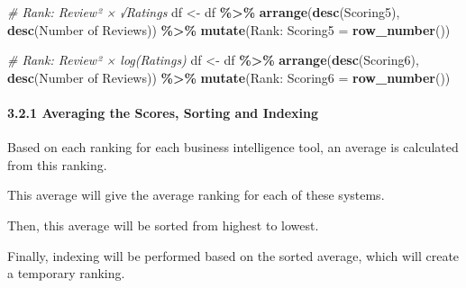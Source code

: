 \documentclass[
]{article}
\newenvironment{Shaded}{\begin{snugshade}}{\end{snugshade}}
\newcommand{\AttributeTok}[1]{\textcolor[rgb]{0.13,0.29,0.53}{#1}}
\newcommand{\CommentTok}[1]{\textcolor[rgb]{0.56,0.35,0.01}{\textit{#1}}}
\newcommand{\FunctionTok}[1]{\textcolor[rgb]{0.13,0.29,0.53}{\textbf{#1}}}
\newcommand{\NormalTok}[1]{#1}
\newcommand{\OtherTok}[1]{\textcolor[rgb]{0.56,0.35,0.01}{#1}}
\newcommand{\SpecialCharTok}[1]{\textcolor[rgb]{0.81,0.36,0.00}{\textbf{#1}}}
\newcommand{\StringTok}[1]{\textcolor[rgb]{0.31,0.60,0.02}{#1}}
\begin{document}
\begin{Shaded}
\begin{Highlighting}[]
\CommentTok{\# Rank: Review² × √Ratings}
\NormalTok{df }\OtherTok{\textless{}{-}}\NormalTok{ df }\SpecialCharTok{\%\textgreater{}\%}
  \FunctionTok{arrange}\NormalTok{(}\FunctionTok{desc}\NormalTok{(}\StringTok{\textasciigrave{}}\AttributeTok{Scoring5}\StringTok{\textasciigrave{}}\NormalTok{), }\FunctionTok{desc}\NormalTok{(}\StringTok{\textasciigrave{}}\AttributeTok{Number of Reviews}\StringTok{\textasciigrave{}}\NormalTok{)) }\SpecialCharTok{\%\textgreater{}\%}
  \FunctionTok{mutate}\NormalTok{(}\StringTok{\textasciigrave{}}\AttributeTok{Rank: Scoring5}\StringTok{\textasciigrave{}} \OtherTok{=} \FunctionTok{row\_number}\NormalTok{())}

\CommentTok{\# Rank: Review² × log(Ratings)}
\NormalTok{df }\OtherTok{\textless{}{-}}\NormalTok{ df }\SpecialCharTok{\%\textgreater{}\%}
  \FunctionTok{arrange}\NormalTok{(}\FunctionTok{desc}\NormalTok{(}\StringTok{\textasciigrave{}}\AttributeTok{Scoring6}\StringTok{\textasciigrave{}}\NormalTok{), }\FunctionTok{desc}\NormalTok{(}\StringTok{\textasciigrave{}}\AttributeTok{Number of Reviews}\StringTok{\textasciigrave{}}\NormalTok{)) }\SpecialCharTok{\%\textgreater{}\%}
  \FunctionTok{mutate}\NormalTok{(}\StringTok{\textasciigrave{}}\AttributeTok{Rank: Scoring6}\StringTok{\textasciigrave{}} \OtherTok{=} \FunctionTok{row\_number}\NormalTok{())}
\end{Highlighting}
\end{Shaded}

\paragraph{3.2.1 Averaging the Scores, Sorting and
Indexing}\label{averaging-the-scores-sorting-and-indexing}

Based on each ranking for each business intelligence tool, an average is
calculated from this ranking.

This average will give the average ranking for each of these systems.

Then, this average will be sorted from highest to lowest.

Finally, indexing will be performed based on the sorted average, which
will create a temporary ranking.
\end{document}

